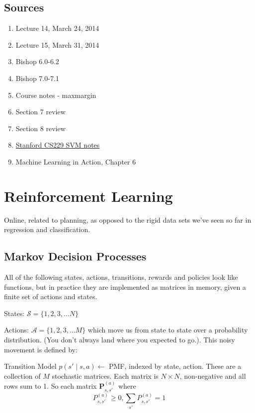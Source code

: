 \documentclass[11pt, oneside]{article}   	%
\begin{document}
\subsection{Sources}

\begin{enumerate}
	\item Lecture 14, March 24, 2014
	\item Lecture 15, March 31, 2014
	\item Bishop 6.0-6.2 
	\item Bishop 7.0-7.1
	\item Course notes - maxmargin
	\item Section 7 review
	\item Section 8 review
	\item \href{http://cs229.stanford.edu/notes/cs229-notes3.pdf}{Stanford CS229 SVM notes}
	\item Machine Learning in Action, Chapter 6
\end{enumerate}

\section{Reinforcement Learning}

Online, related to planning, as opposed to the rigid data sets we've seen so far in regression and classification.

\subsection{Markov Decision Processes}

All of the following states, actions, transitions, rewards and policies look like functions, but in practice they are implemented as matrices in memory, given a finite set of actions and states.

States: $\mathcal{S} = \{1,2,3,...N\}$

Actions: $\mathcal{A} = \{1,2,3,...M\}$ which move us from state to state over a probability distribution. (You don't always land where you expected to go.). This noisy movement is defined by:

Transition Model $p(s'\mid s,a) \leftarrow$  PMF, indexed by state, action. These are a collection of $M$ stochastic matrices. Each matrix is $N \times N$, non-negative and all rows sum to 1. So each matrix $\mathbf{P}_{s,s'}^{(a)}$ where 
\begin{equation}
	P_{s,s'}^{(a)} \ge 0, \sum_{s'}P_{s,s'}^{(a)} = 1
\end{equation}
\end{document}
